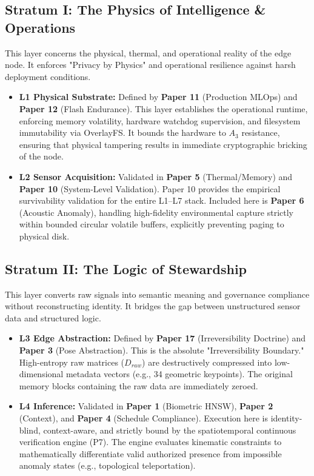 \documentclass[conference]{IEEEtran}
\theoremstyle{definition}
\begin{document}
\subsection{Stratum I: The Physics of Intelligence \& Operations}
This layer concerns the physical, thermal, and operational reality of the edge node. It enforces "Privacy by Physics" and operational resilience against harsh deployment conditions.
\begin{itemize}
    \item \textbf{L1 Physical Substrate:} Defined by \textbf{Paper 11} (Production MLOps) and \textbf{Paper 12} (Flash Endurance). This layer establishes the operational runtime, enforcing memory volatility, hardware watchdog supervision, and filesystem immutability via OverlayFS. It bounds the hardware to $A_3$ resistance, ensuring that physical tampering results in immediate cryptographic bricking of the node.
    \item \textbf{L2 Sensor Acquisition:} Validated in \textbf{Paper 5} (Thermal/Memory) and \textbf{Paper 10} (System-Level Validation). Paper 10 provides the empirical survivability validation for the entire L1–L7 stack. Included here is \textbf{Paper 6} (Acoustic Anomaly), handling high-fidelity environmental capture strictly within bounded circular volatile buffers, explicitly preventing paging to physical disk.
\end{itemize}

\subsection{Stratum II: The Logic of Stewardship}
This layer converts raw signals into semantic meaning and governance compliance without reconstructing identity. It bridges the gap between unstructured sensor data and structured logic.
\begin{itemize}
    \item \textbf{L3 Edge Abstraction:} Defined by \textbf{Paper 17} (Irreversibility Doctrine) and \textbf{Paper 3} (Pose Abstraction). This is the absolute "Irreversibility Boundary." High-entropy raw matrices ($D_{raw}$) are destructively compressed into low-dimensional metadata vectors (e.g., 34 geometric keypoints). The original memory blocks containing the raw data are immediately zeroed.
    \item \textbf{L4 Inference:} Validated in \textbf{Paper 1} (Biometric HNSW), \textbf{Paper 2} (Context), and \textbf{Paper 4} (Schedule Compliance). Execution here is identity-blind, context-aware, and strictly bound by the spatiotemporal continuous verification engine (P7). The engine evaluates kinematic constraints to mathematically differentiate valid authorized presence from impossible anomaly states (e.g., topological teleportation).
\end{itemize}
\end{document}
